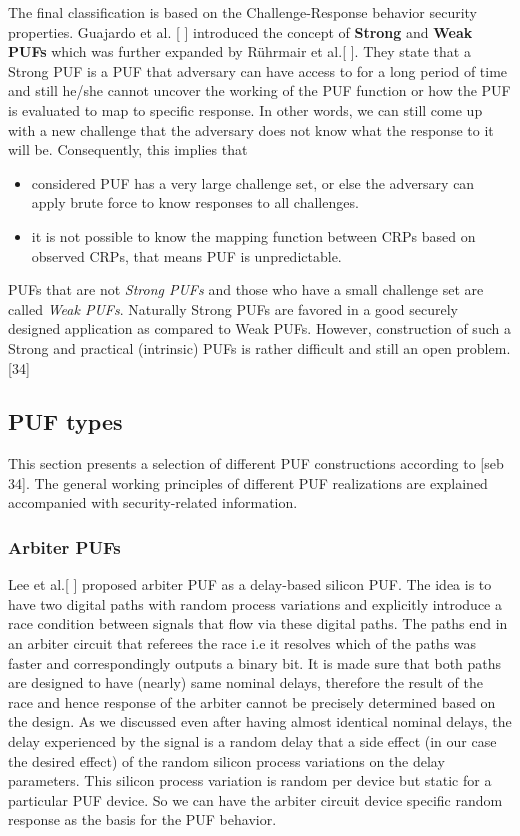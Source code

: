 The final classification is based on the Challenge-Response behavior security properties. Guajardo et al. [ ] introduced the concept of \textbf{Strong} and \textbf{Weak PUFs} which was further expanded by Rührmair et al.[ ]. They state that a Strong PUF is a PUF that adversary can have access to for a long period of time and still he/she cannot uncover the working of the PUF function or how the PUF is evaluated to map to specific response. In other words, we can still come up with a
new challenge that the adversary does not know what the response to it will be. Consequently, this implies that
\begin{itemize}
	\item considered PUF has a very large challenge set, or else the adversary can apply brute force to know responses to all challenges.
	\item it is not possible to know the mapping function between CRPs based on observed CRPs, that means PUF is unpredictable.
\end{itemize}
PUFs that are not \emph{Strong PUFs} and those who have a small challenge set are called \emph{Weak PUFs}. Naturally Strong PUFs are favored in a good securely designed application as compared to Weak PUFs. However, construction of such a Strong and practical (intrinsic) PUFs is rather difficult and still an open problem. [34]\\

\subsection{PUF types}
This section presents a selection of different PUF constructions according to [seb 34]. The general working principles of different PUF realizations are explained accompanied with security-related information.

\subsubsection{Arbiter PUFs}
\label{arbiterpuf}

Lee et al.[ ] proposed arbiter PUF as a delay-based silicon PUF. The idea is to have two digital paths with random process variations and explicitly introduce a race condition between signals that flow via these digital paths. The paths end in an arbiter circuit that referees the race i.e it resolves which of the paths was faster and correspondingly outputs a binary bit. It is made sure that both paths are designed to have (nearly) same nominal delays, therefore the result of the race and hence
response of the arbiter cannot be precisely determined based on the design. As we discussed even after having almost identical nominal delays, the delay experienced by the signal is a random delay that a side effect (in our case the desired effect) of the random silicon process variations on the delay parameters. This silicon process variation is random per device but static for a particular PUF device. So we can have the arbiter circuit device specific random response as the basis for the PUF
behavior.\\

